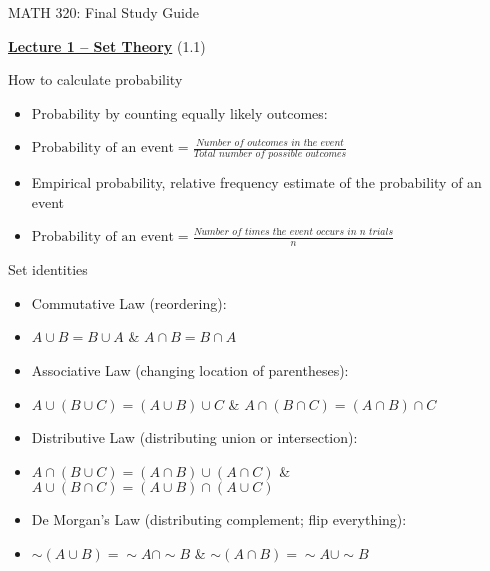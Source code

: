 \documentclass{article}
\newcommand{\bu}[1]{\textbf{\ul{#1}}}				%
\newcommand{\comp}{{\sim}}			%
\begin{document}
\begin{center}
{\Huge MATH 320: Final Study Guide}

\end{center}

\bigskip\bigskip


{\large \bu{Lecture 1 -- Set Theory}} (1.1)\bigskip

How to calculate probability
\begin{itemize}
    \item Probability by counting equally likely outcomes:
    \item[] $\displaystyle \text{Probability of an event} = \frac{\textit{Number of outcomes in the event}}{\textit{Total number of possible outcomes}}$
    \item Empirical probability, relative frequency estimate of the probability of an event
    \item[] $\displaystyle \text{Probability of an event} = \frac{\textit{Number of times the event occurs in n trials}}{\textit{n}}$
\end{itemize}\bigskip
    
Set identities
\begin{itemize}
    \item Commutative Law (reordering): 
    \item[] $A \cup B = B \cup A$ \hspace{10pt} \& \hspace{10pt} $A \cap B = B \cap A$ 
    \item Associative Law (changing location of parentheses):
    \item[] $A \cup (B \cup C) = (A \cup B) \cup C$ \hspace{10pt} \& \hspace{10pt} $A \cap (B \cap C) = (A \cap B) \cap C$
    \item Distributive Law (distributing union or intersection):
    \item[] $A \cap (B \cup C) = (A \cap B) \cup (A \cap C)$ \hspace{10pt} \& \hspace{10pt} $A \cup (B \cap C) = (A \cup B) \cap (A \cup C)$
    \item De Morgan's Law (distributing complement; flip everything):
    \item[] $\comp (A \cup B) = \comp A \cap \comp B$ \hspace{10pt} \& \hspace{10pt} $\comp (A \cap B) = \comp A \cup \comp B$
\end{itemize}\bigskip
\end{document}

